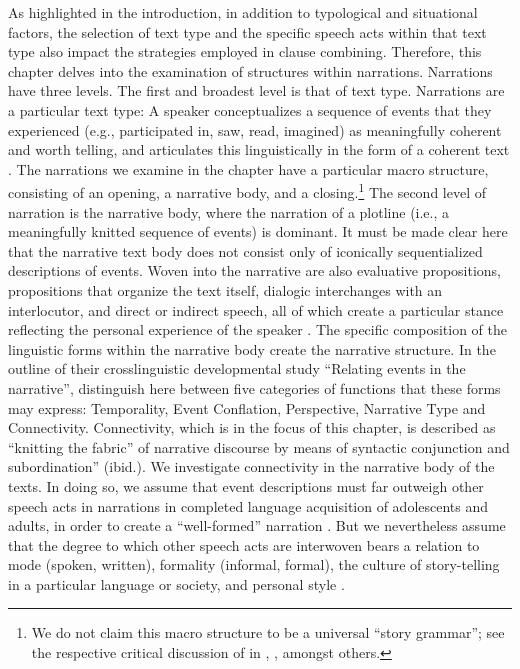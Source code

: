 \documentclass[output=paper,colorlinks,citecolor=brown]{langscibook}
\begin{document}
As highlighted in the introduction, in addition to typological and situational factors, the selection of text type and the specific speech acts within that text type also impact the strategies employed in clause combining. Therefore, this chapter delves into the examination of structures within narrations.
Narrations have three levels. The first and broadest level is that of text type. Narrations are a particular text type: A speaker conceptualizes a sequence of events that they experienced (e.g., participated in, saw, read, imagined) as meaningfully coherent and worth telling, and articulates this linguistically in the form of a coherent text \parencite{labov1997narrative}. The narrations we examine in the chapter have a particular macro structure, consisting of an opening, a narrative body, and a closing.{\footnote{We do not claim this macro structure to be a universal ``story grammar''; see the respective critical discussion of \textcite{labov1997narrative}  in \textcite{lambrou2005story}, \textcite{andrews2013doing}, amongst others.}}  
The second level of narration is the narrative body, where the narration of a plotline (i.e., a meaningfully knitted sequence of events) is dominant. It must be made clear here that the narrative text body does not consist only of iconically sequentialized descriptions of events. Woven into the narrative are also evaluative propositions, propositions that organize the text itself, dialogic interchanges with an interlocutor, and direct or indirect speech, all of which create a particular stance reflecting the personal experience of the speaker \parencite{lehmann2023guidelines}. 
The specific composition of the linguistic forms within the narrative body create the narrative structure. In the outline of their crosslinguistic developmental study “Relating events in the narrative”, \textcite [19] {berman2013research}  distinguish here between five categories of functions that these forms may express: Temporality, Event Conflation, Perspective, Narrative Type and Connectivity. Connectivity, which is in the focus of this chapter, is described as ``knitting the fabric'' of narrative discourse by means of syntactic conjunction and subordination” (ibid.). 
We investigate connectivity in the narrative body of the texts. In doing so, we assume that event descriptions must far outweigh other speech acts in narrations in completed language acquisition of adolescents and adults, in order to create a “well-formed” narration \parencite [40] {berman2013research}. But we nevertheless assume that the degree to which other speech acts are interwoven bears a relation to mode (spoken, written), formality (informal, formal), the culture of story-telling in a particular language or society, and personal style \parencite{lambrou2005story,andrews2013doing}. 
\end{document}
